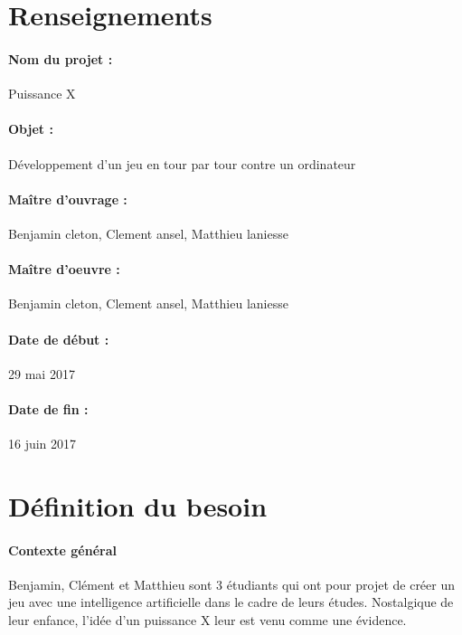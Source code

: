 \documentclass[a4paper,oneside]{article}
\title{\mytitle }
\author{Benjamin cleton, Clement ansel et Matthieu laniesse}
\date{29 mai 2017}
\begin{document}
\maketitle

\thispagestyle{fancyplain}



\section{Renseignements}

\paragraph{Nom du projet :}
Puissance X

\paragraph{Objet :}
Développement d'un jeu en tour par tour contre un ordinateur

\paragraph{Maître d'ouvrage :}
Benjamin cleton, Clement ansel, Matthieu laniesse

\paragraph{Maître d'oeuvre : }
Benjamin cleton, Clement ansel, Matthieu laniesse

\paragraph{Date de début :}
29 mai 2017

\paragraph{Date de fin :}
16 juin 2017



\newpage

\section{Définition du besoin}

\paragraph{Contexte général\\}
Benjamin, Clément et Matthieu sont 3 étudiants qui ont pour projet de créer un jeu avec une intelligence artificielle dans le cadre de leurs études.
Nostalgique de leur enfance, l'idée d'un puissance X leur est venu comme une évidence.
\end{document}
